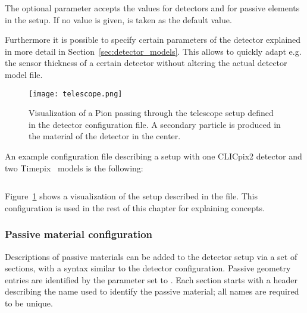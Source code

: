 The optional parameter  accepts the values  for detectors and  for passive elements in the setup.
If no value is given,  is taken as the default value.

Furthermore it is possible to specify certain parameters of the detector explained in more detail in Section~\ref{sec:detector_models}.
This allows to quickly adapt e.g. the sensor thickness of a certain detector without altering the actual detector model file.

\begin{figure}[t]
  \centering
  \texttt{[image: telescope.png]}
  \caption{Visualization of a Pion passing through the telescope setup defined in the detector configuration file. A secondary particle is produced in the material of the detector in the center.}
  \label{fig:telescope}
\end{figure}

An example configuration file describing a setup with one CLICpix2 detector and two Timepix~\cite{timepix} models is the following:
\inputminted[frame=single,framesep=3pt,breaklines=true,tabsize=2,linenos]{ini}{../../etc/manual_detector.conf}
Figure~\ref{fig:telescope} shows a visualization of the setup described in the file.
This configuration is used in the rest of this chapter for explaining concepts.

\subsubsection{Passive material configuration}
\label{sec:passive_material_config}

Descriptions of passive materials can be added to the detector setup via a set of sections, with a syntax similar to the detector configuration.
Passive geometry entries are identified by the  parameter set to .
Each section starts with a header describing the name used to identify the passive material; all names are required to be unique.

